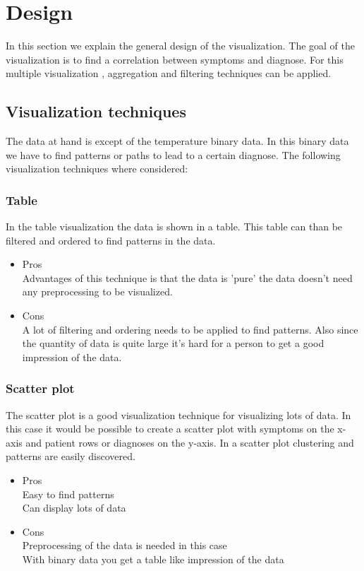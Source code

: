 \documentclass[a4paper,twoside,11pt]{article}
\begin{document}
\section{Design}
In this section we explain the general design of the visualization. The goal of the visualization is to find a correlation between symptoms and diagnose. For this multiple visualization , aggregation and filtering techniques can be applied.

\subsection{Visualization techniques}
The data at hand is except of the temperature binary data. In this binary data we have to find patterns or paths to lead to a certain diagnose.
The following visualization techniques where considered:

\subsubsection{Table}
In the table visualization the data is shown in a table. This table can than be filtered and ordered to find patterns in the data.

\begin{itemize}
  \item Pros\\
    Advantages of this technique is that the data is 'pure' the data doesn't need any preprocessing to be visualized.
  \item Cons \\
    A lot of filtering and ordering needs to be applied to find patterns. Also since the quantity of data is quite large it's hard for a person to get a good impression of the data.
\end{itemize}

\subsubsection{Scatter plot}
The scatter plot is a good visualization technique for visualizing lots of data. In this case it would be possible to create a scatter plot with symptoms on the x-axis and patient rows or diagnoses on the y-axis. In a scatter plot clustering and patterns are easily discovered.
\begin{itemize}
  \item Pros\\
    Easy to find patterns \\
    Can display lots of data \\
  \item Cons \\
    Preprocessing of the data is needed in this case \\
    With binary data you get a table like impression of the data \\
\end{itemize}
\end{document}
